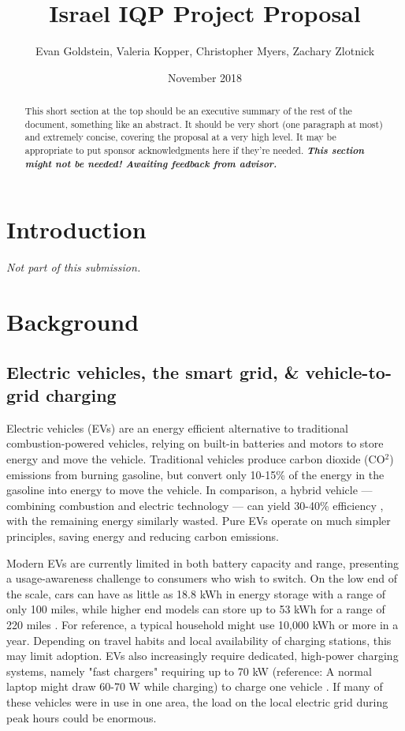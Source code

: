 \documentclass{article}                         %
\title{Israel IQP Project Proposal}
\author{Evan Goldstein, Valeria Kopper, Christopher Myers, Zachary Zlotnick}
\date{November 2018}
\begin{document}
\maketitle

\renewcommand\abstractname{Summary} %
\begin{abstract}
This short section at the top should be an executive summary of the rest of the document, something like an abstract. It should be very short (one paragraph at most) and extremely concise, covering the proposal at a very high level. It may be appropriate to put sponsor acknowledgments here if they're needed. \textbf{\textit{This section might not be needed! Awaiting feedback from advisor.}}
\end{abstract}

\tableofcontents
\newpage
{}

\doublespacing

\section{Introduction}
\textit{Not part of this submission.}

\newpage
\section{Background}
\subsection{Electric vehicles, the smart grid, \& vehicle-to-grid charging}

Electric vehicles (EVs) are an energy efficient alternative to traditional combustion-powered vehicles, relying on built-in batteries and motors to store energy and move the vehicle. Traditional vehicles produce carbon dioxide (CO$^2$) emissions from burning gasoline, but convert only 10-15\% of the energy in the gasoline into energy to move the vehicle. In comparison, a hybrid vehicle --- combining combustion and electric technology --- can yield 30-40\% efficiency \cite{Zhu2015DistributedGrid}, with the remaining energy similarly wasted. Pure EVs operate on much simpler principles, saving energy and reducing carbon emissions.

Modern EVs are currently limited in both battery capacity and range, presenting a usage-awareness challenge to consumers who wish to switch. On the low end of the scale, cars can have as little as 18.8 kWh in energy storage with a range of only 100 miles, while higher end models can store up to 53 kWh for a range of 220 miles \cite{Ustun2015ImpactSystems}. For reference, a typical household might use 10,000 kWh or more in a year. Depending on travel habits and local availability of charging stations, this may limit adoption. EVs also increasingly require dedicated, high-power charging systems, namely "fast chargers" requiring up to 70 kW (reference: A normal laptop might draw 60-70 W while charging) to charge one vehicle \cite{Ustun2015ImpactSystems}. If many of these vehicles were in use in one area, the load on the local electric grid during peak hours could be enormous.
\end{document}
